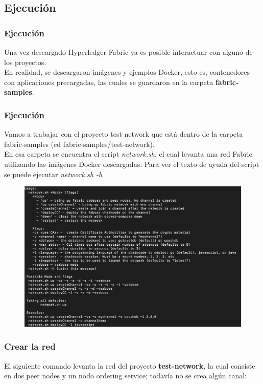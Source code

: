 \documentclass{beamer}
\begin{document}
	\subsection{Ejecución}
	
	\begin{frame}
		\frametitle{Ejecución}
		Una vez descargado Hyperledger Fabric ya es posible interactuar con alguno de los proyectos.\\
		\vspace{4mm}
		En realidad, se descargaron imágenes y ejemplos Docker, esto es, contenedores con aplicaciones precargadas, las cuales se guardaron en la carpeta \textbf{fabric-samples}.
	\end{frame}
	
	\begin{frame}
		\frametitle{Ejecución}
		Vamos a trabajar con el proyecto test-network que está dentro de la carpeta fabric-samples (cd fabric-samples/test-network).\\
		\vspace{4mm}
		En esa carpeta se encuentra el script \textit{network.sh}, el cual levanta una red Fabric utilizando las imágenes Docker descargadas. Para ver el texto de ayuda del script se puede ejecutar \textit{network.sh -h}
	\end{frame}
	
	\begin{frame}
		\begin{figure}[h]
			\includegraphics[scale=.4]{start_05}
			\centering
		\end{figure}
	\end{frame}
	
	\begin{frame}
		\frametitle{Crear la red}
		El siguiente comando levanta la red del proyecto \textbf{test-network}, la cual consiste en dos peer nodes y un nodo ordering service; todavía no se crea algún canal:
		\begin{center}
			\setlength{\fboxrule}{1mm}
			\setlength{\fboxsep}{3mm}
			\framebox[9cm][c]{
				\textbf{./network.sh up}
			}
		\end{center}
	\end{frame}
	
\end{document}
